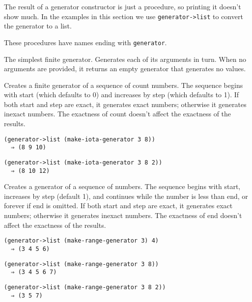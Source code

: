 The result of a generator constructor is just a procedure, so printing
it doesn't show much. In the examples in this section we use
\texttt{generator->list} to convert the generator to a
list.

These procedures have names ending with \texttt{generator}.


\begin{entry}{%
  }

The simplest finite generator. Generates each of its arguments in turn.
When no arguments are provided, it returns an empty generator that
generates no values.
\end{entry}

\begin{entry}{%
  }

Creates a finite generator of a sequence of count numbers. The sequence
begins with start (which defaults to 0) and increases by step (which
defaults to 1). If both start and step are exact, it generates exact
numbers; otherwise it generates inexact numbers. The exactness of count
doesn't affect the exactness of the results.

\begin{verbatim}
(generator->list (make-iota-generator 3 8))
  ⇒ (8 9 10)
\end{verbatim}

\begin{verbatim}
(generator->list (make-iota-generator 3 8 2))
  ⇒ (8 10 12)
\end{verbatim}
\end{entry}

\begin{entry}{%
  }

  Creates a generator of a sequence of numbers. The sequence
  begins with start, increases by step (default 1), and continues
  while the number is less than end, or forever if end is omitted. If
  both start and step are exact, it generates exact numbers; otherwise
  it generates inexact numbers. The exactness of end doesn't affect
  the exactness of the results.

\begin{verbatim}
(generator->list (make-range-generator 3) 4)
  ⇒ (3 4 5 6)
\end{verbatim}
\begin{verbatim}
(generator->list (make-range-generator 3 8))
  ⇒ (3 4 5 6 7)
\end{verbatim}
\begin{verbatim}
(generator->list (make-range-generator 3 8 2))
  ⇒ (3 5 7)
\end{verbatim}
\end{entry}

